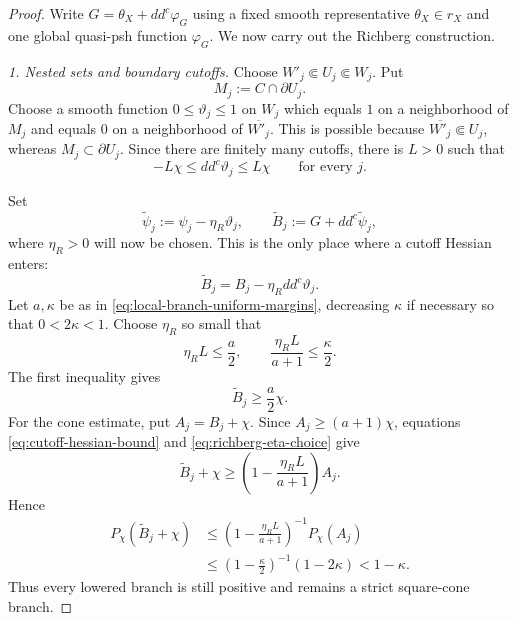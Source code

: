 \documentclass[reqno]{amsart}
\theoremstyle{remark}
\newcommand{\ddc}{dd^c}
\theoremstyle{plain}
\begin{document}
\begin{proof}
Write $G=\theta_X+\ddc\varphi_G$ using a fixed smooth representative $\theta_X\in r_X$ and one global
quasi-psh function $\varphi_G$.  We now carry out the Richberg
construction.

\smallskip
\noindent\emph{1. Nested sets and boundary cutoffs.}
Choose $ W'_j\Subset U_j\Subset W_j$.  Put
\[
 M_j:=C\cap\partial U_j.
\]
Choose a smooth function $0\leq\vartheta_j\leq1$ on $W_j$ which
equals $1$ on a neighborhood of $M_j$ and equals $0$ on a
neighborhood of $\overline{W'_j}$.  This is possible because
$\overline{W'_j}\Subset U_j$, whereas $M_j\subset\partial U_j$.
Since there are finitely many cutoffs, there is $L>0$ such that
\begin{equation}\label{eq:cutoff-hessian-bound}
 -L\chi\leq\ddc\vartheta_j\leq L\chi
 \qquad\text{for every }j.
\end{equation}

Set
\[
 \widetilde\psi_j:=\psi_j-\eta_R\vartheta_j,\qquad
 \widetilde B_j:=G+\ddc\widetilde\psi_j,
\]
where $\eta_R>0$ will now be chosen.  This is the only place where a
cutoff Hessian enters:
\begin{equation}\label{eq:richberg-cutoff-error}
 \widetilde B_j=B_j-\eta_R\ddc\vartheta_j.
\end{equation}
Let $a,\kappa$ be as in
\eqref{eq:local-branch-uniform-margins}, decreasing $\kappa$ if
necessary so that $0<2\kappa<1$.  Choose $\eta_R$ so small that
\begin{equation}\label{eq:richberg-eta-choice}
 \eta_RL\leq\frac a2,\qquad
 \frac{\eta_RL}{a+1}\leq\frac{\kappa}{2}.
\end{equation}
The first inequality gives
\[
 \widetilde B_j\geq\frac a2\chi.
\]
For the cone estimate, put $A_j=B_j+\chi$.  Since
$A_j\geq(a+1)\chi$, equations
\eqref{eq:cutoff-hessian-bound} and
\eqref{eq:richberg-eta-choice} give
\[
 \widetilde B_j+\chi
 \geq
 \left(1-\frac{\eta_RL}{a+1}\right)A_j.
\]
Hence
\[
\begin{aligned}
 P_\chi(\widetilde B_j+\chi)
 &\leq
 \left(1-\frac{\eta_RL}{a+1}\right)^{-1}
 P_\chi(A_j)\\
 &\leq
 \left(1-\frac{\kappa}{2}\right)^{-1}(1-2\kappa)
 <1-\kappa.
\end{aligned}
\]
Thus every lowered branch is still positive and remains a strict
square-cone branch.  


\end{proof}
\end{document}
